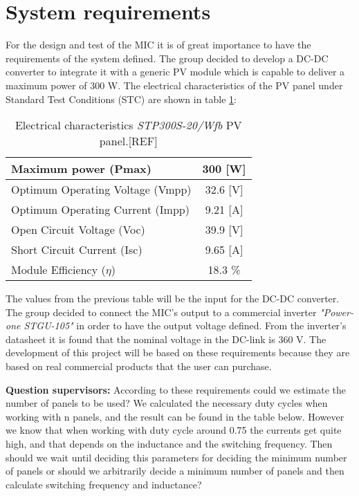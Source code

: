 \section{System requirements}

For the design and test of the MIC it is of great importance to have the requirements of the system defined. The group decided to develop a DC-DC converter to integrate it with a generic PV module which is capable to deliver a maximum power of 300 W. The electrical characteristics of the PV panel under Standard Test Conditions (STC) are shown in table \ref{el_charact_PV_panel}:

\begin{table}[H]
	\centering
	\begin{tabular}{ |l|c| } 
		\hline
		Maximum power (Pmax) & 300 [W]  \\ \hline
		Optimum Operating Voltage (Vmpp) & 32.6 [V]  \\ \hline
		Optimum Operating Current (Impp) & 9.21 [A]  \\ \hline
		Open Circuit Voltage (Voc) &  39.9 [V]\\ \hline
		Short Circuit Current (Isc) & 9.65 [A]  \\ \hline
		Module Efficiency ($\eta$) & 18.3 \%  \\ \hline
	\end{tabular}
	\caption{Electrical characteristics \textit{STP300S-20/Wfb} PV panel.[REF]}
	\label{el_charact_PV_panel}
\end{table}

The values from the previous table will be the input for the DC-DC converter. The group decided to connect the MIC's output to a commercial inverter \textit{"Power-one STGU-105"} in order to have the output voltage defined. From the inverter's datasheet it is found that the nominal voltage in the DC-link is 360 V. 
The development of this project will be based on these requirements because they are based on real commercial products that the user can purchase. 

\textbf{Question supervisors:} According to these requirements could we estimate the number of panels to be used? We calculated the necessary duty cycles when working with n panels, and the result can be found in the table below. However we know that when working with duty cycle around 0.75 the currents get quite high, and that depends on the inductance and the switching frequency. Then should we wait until deciding this parameters for deciding the minimum number of panels or should we arbitrarily decide a minimum number of panels and then calculate switching frequency and inductance?

